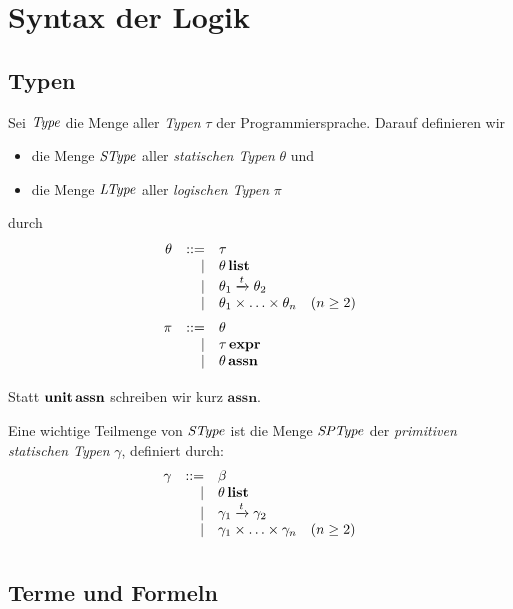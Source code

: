 \documentclass[12pt,a4paper,bigheadings]{scrartcl}
\newcommand{\assn}{\ensuremath{\mathbf{assn}}}
\newcommand{\atype}[1]{#1\,\assn}
\newcommand{\bexpr}{\ensuremath{\mathbf{expr}}}
\newcommand{\etype}[1]{#1\,\bexpr}
\newcommand{\Stype}{\name{SType}}
\newcommand{\Sptype}{\name{SPType}}
\newcommand{\tto}{\ensuremath{\xrightarrow{t}}}
\begin{document}
\section{Syntax der Logik}

\subsection{Typen}

Sei ${\text{\it Type\/}}$ die Menge aller {\em Typen} $\tau$ der Programmiersprache. Darauf definieren wir 
\begin{itemize}
  \item die Menge $\Stype$ aller {\em statischen Typen} $\theta$ und
  \item die Menge ${\text{\it LType\/}}$ aller {\em logischen Typen} $\pi$
\end{itemize}
durch
\[\bgram
\theta  \is \tau
        \al \ltype{\theta}
        \al \theta_1 \tto \theta_2
        \al \theta_1 \times \ldots \times \theta_n \quad (n \ge 2)
        \n
\pi \is \theta
    \al \etype{\tau}
    \al \atype{\theta}
    \n
\egram\]
Statt $\atype{\unit}$ schreiben wir kurz $\assn$.

Eine wichtige Teilmenge von $\Stype$ ist die Menge $\Sptype$ der {\em primitiven statischen Typen} $\gamma$,
definiert durch:
\[\bgram
\gamma  \is \beta
        \al \ltype{\theta}
        \al \gamma_1 \tto \gamma_2
        \al \gamma_1 \times \ldots \times \gamma_n \quad (n \ge 2)
        \n
\egram\]

\subsection{Terme und Formeln}
\end{document}
